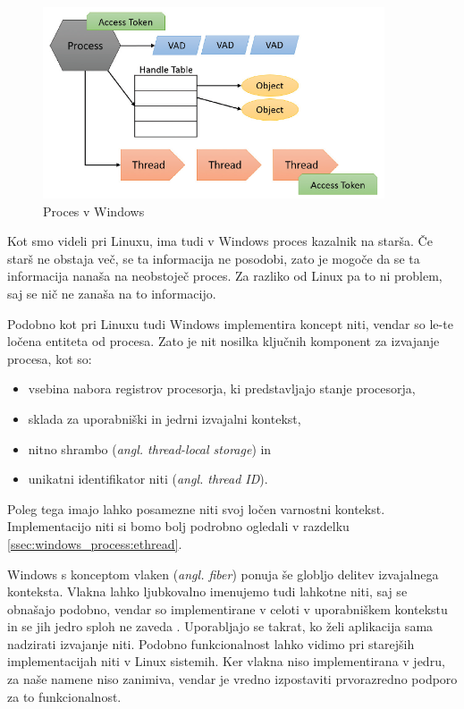 \documentclass[a4paper,12pt,openright]{book}
\begin{document}
\begin{figure}[h!]
	\begin{center}
		\includegraphics[width=0.9\textwidth]{images/windows_process.png}
	\end{center}
	\caption{Proces v Windows \cite{Yosifovich_Russinovich_Solomon_Ionescu_2017}}
	\label{fig:windows_process}
\end{figure}

Kot smo videli pri Linuxu, ima tudi v Windows proces kazalnik na starša.
Če starš ne obstaja več, se ta informacija ne posodobi, zato je mogoče da se ta informacija nanaša na neobstoječ proces.
Za razliko od Linux pa to ni problem, saj se nič ne zanaša na to informacijo.

Podobno kot pri Linuxu tudi Windows implementira koncept niti, vendar so le-te ločena entiteta od procesa.
Zato je nit nosilka ključnih komponent za izvajanje procesa, kot so:
\begin{itemize}
	\item vsebina nabora registrov procesorja, ki predstavljajo stanje procesorja,
	\item sklada za uporabniški in jedrni izvajalni kontekst,
	\item nitno shrambo (\textit{angl. thread-local storage}) in
	\item unikatni identifikator niti (\textit{angl. thread ID}).
\end{itemize}
Poleg tega imajo lahko posamezne niti svoj ločen varnostni kontekst.
Implementacijo niti si bomo bolj podrobno ogledali v razdelku \ref{ssec:windows_process:ethread}.

Windows s konceptom vlaken (\textit{angl. fiber}) ponuja še globljo delitev izvajalnega konteksta.
Vlakna lahko ljubkovalno imenujemo tudi lahkotne niti, saj se obnašajo podobno, vendar so implementirane v celoti v uporabniškem kontekstu in se jih jedro sploh ne zaveda \cite{Yosifovich_Russinovich_Solomon_Ionescu_2017}.
Uporabljajo se takrat, ko želi aplikacija sama nadzirati izvajanje niti.
Podobno funkcionalnost lahko vidimo pri starejših implementacijah niti v Linux sistemih.
Ker vlakna niso implementirana v jedru, za naše namene niso zanimiva, vendar je vredno izpostaviti prvorazredno podporo za to funkcionalnost.
\end{document}
